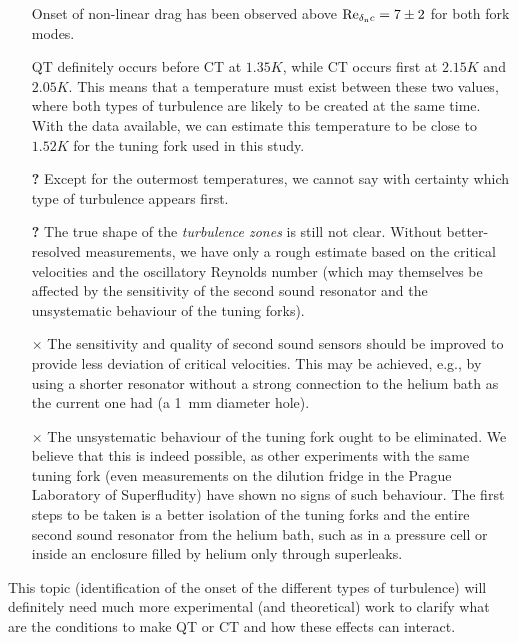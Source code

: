 \begin{itemize}
	\item[\checkmark] Onset of non-linear drag has been observed above $ \text{Re}_{\delta_{\mathrm{n}}c}=7\pm 2 $ for both fork modes.

	\item[\checkmark] QT definitely occurs before CT at $ 1.35\unit{K} $, while CT occurs first at $ 2.15\unit{K} $ and $ 2.05\unit{K} $. This means that a temperature must exist between these two values, where both types of turbulence are likely to be created at the same time. With the data available, we can estimate this temperature to be close to $ 1.52\unit{K} $ for the tuning fork used in this study.

	\item[\textbf{?}] Except for the outermost temperatures, we cannot say with certainty which type of turbulence appears first.

	\item[\textbf{?}] The true shape of the \textit{turbulence zones} is still not clear. Without better-resolved measurements, we have only a rough estimate based on the critical velocities and the oscillatory Reynolds number (which may themselves be affected by the sensitivity of the second sound resonator and the unsystematic behaviour of the tuning forks).

	\item[$\times$] The sensitivity and quality of second sound sensors should be improved to provide less deviation of critical velocities. This may be achieved, e.g., by using a shorter resonator without a strong connection to the helium bath as the current one had (a 1~mm diameter hole).

	\item[$ \times $] The unsystematic behaviour of the tuning fork ought to be eliminated. We believe that this is indeed possible, as other experiments with the same tuning fork (even measurements on the dilution fridge in the Prague Laboratory of Superfludity) have shown no signs of such behaviour. The first steps to be taken is a better isolation of the tuning forks and the entire second sound resonator from the helium bath, such as in a pressure cell or inside an enclosure filled by helium only through superleaks.
\end{itemize}

This topic (identification of the onset of the different types of turbulence) will definitely need much more experimental (and theoretical) work to clarify what are the conditions to make QT or CT and how these effects can interact.
